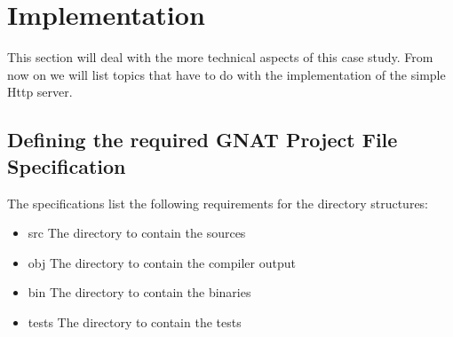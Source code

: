 \section{Implementation}
This section will deal with the more technical aspects of this case study. From
now on we will list topics that have to do with the implementation of the simple
Http server.

\subsection{Defining the required GNAT Project File Specification}
The specifications list the following requirements for the directory structures: 
\begin{itemize}
  \item{src} The directory to contain the sources
  \item{obj} The directory to contain the compiler output
  \item{bin} The directory to contain the binaries
  \item{tests} The directory to contain the tests
\end{itemize}


